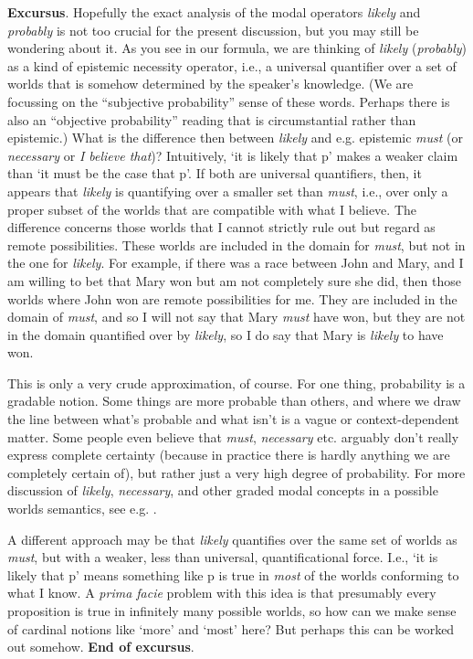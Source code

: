 \textbf{Excursus}. Hopefully the exact analysis of the modal operators
\emph{likely} and \emph{probably} is not too crucial for the present discussion,
but you may still be wondering about it. As you see in our formula, we are
thinking of \emph{likely} (\emph{probably}) as a kind of epistemic necessity
operator, i.e., a universal quantifier over a set of worlds that is somehow
determined by the speaker's knowledge. (We are focussing on the ``subjective
probability'' sense of these words. Perhaps there is also an ``objective
probability'' reading that is circumstantial rather than epistemic.) What is the
difference then between \emph{likely} and e.g. epistemic \emph{must} (or
\emph{necessary} or \emph{I believe that})? Intuitively, `it is likely that p'
makes a weaker claim than `it must be the case that p'. If both are universal
quantifiers, then, it appears that \emph{likely} is quantifying over a smaller
set than \emph{must}, i.e., over only a proper subset of the worlds that are
compatible with what I believe. The difference concerns those worlds that I
cannot strictly rule out but regard as remote possibilities. These worlds are
included in the domain for \emph{must}, but not in the one for \emph{likely}.
For example, if there was a race between John and Mary, and I am willing to bet
that Mary won but am not completely sure she did, then those worlds where John
won are remote possibilities for me. They are included in the domain of
\emph{must}, and so I will not say that Mary \emph{must} have won, but they are
not in the domain quantified over by \emph{likely}, so I do say that Mary is
\emph{likely} to have won.

This is only a very crude approximation, of course. For one thing, probability
is a gradable notion. Some things are more probable than others, and where we
draw the line between what's probable and what isn't is a vague or
context-dependent matter. Some people even believe that \emph{must},
\emph{necessary} etc. arguably don't really express complete certainty (because
in practice there is hardly anything we are completely certain of), but rather
just a very high degree of probability. For more discussion of \emph{likely},
\emph{necessary}, and other graded modal concepts in a possible worlds
semantics, see e.g. \cite{kratzer-1981-notional, yalcin-2010-probability,
  lassiter-2017-graded-modality}.

A different approach may be that \emph{likely} quantifies over the same set of
worlds as \emph{must}, but with a weaker, less than universal, quantificational
force. I.e., `it is likely that p' means something like p is true in \emph{most}
of the worlds conforming to what I know. A \emph{prima facie} problem with this
idea is that presumably every proposition is true in infinitely many possible
worlds, so how can we make sense of cardinal notions like `more' and `most'
here? But perhaps this can be worked out somehow. \textbf{End of excursus}.

